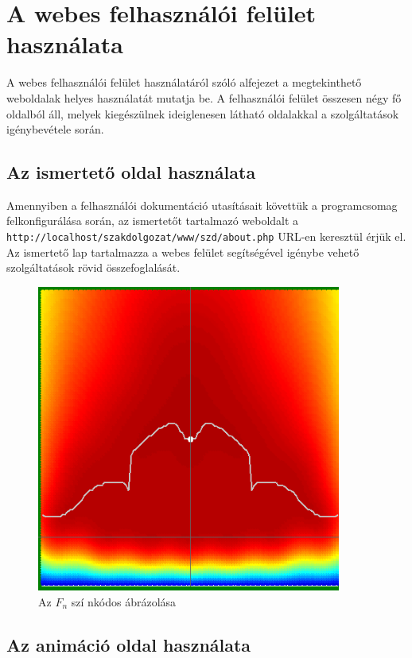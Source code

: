 \documentclass[oneside,titlepage,12pt,a4paper]{report}
\begin{document}
\section{A webes felhasználói felület használata}

A webes felhasználói felület használatáról szóló alfejezet a megtekinthető weboldalak helyes használatát mutatja be. A felhasználói felület összesen négy fő oldalból áll, melyek kiegészülnek ideiglenesen látható oldalakkal a szolgáltatások igénybevétele során. 

\subsection*{Az ismertető oldal használata}

Amennyiben a felhasználói dokumentáció utasításait követtük a programcsomag felkonfigurálása során, az ismertetőt tartalmazó weboldalt a \texttt{http://localhost/szakdolgozat/www/szd/about.php} URL-en keresztül érjük el. Az ismertető lap tartalmazza a webes felület segítségével igénybe vehető szolgáltatások rövid összefoglalását. 

\begin{figure}[H]
\begin{center}
   \includegraphics[width=100mm]{./Abrak/Ereszkedo1/F_2sz.png}
  \caption{Az $F_n$ szí nkódos ábrázolása}
\end{center}
\end{figure}

\subsection*{Az animáció oldal használata}
\end{document}
